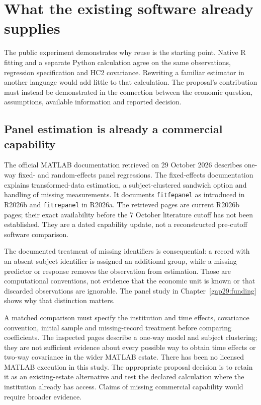\chapter{What the existing software already supplies}
\label{gap29:software-followup}
The public experiment demonstrates why reuse is the starting point. Native
R fitting and a separate Python calculation agree on the same observations,
regression specification and HC2 covariance. Rewriting a familiar estimator
in another language would add little to that calculation. The proposal's
contribution must instead be demonstrated in the connection between the
economic question, assumptions, available information and reported decision.

\section{Panel estimation is already a commercial capability}
The official MATLAB documentation retrieved on 29 October 2026 describes
one-way fixed- and random-effects panel regressions. The fixed-effects
documentation explains transformed-data estimation, a subject-clustered
sandwich option and handling of missing measurements. It documents
\texttt{fitfepanel} as introduced in R2026b and
\texttt{fitrepanel} in R2026a. The retrieved pages are current R2026b pages;
their exact availability before the 7 October literature cutoff has not been
established. They are a dated capability update, not a reconstructed
pre-cutoff software comparison. \citep{gap29matlab}

The documented treatment of missing identifiers is consequential: a record
with an absent subject identifier is assigned an additional group, while a
missing predictor or response removes the observation from estimation.
Those are computational conventions, not evidence that the economic unit
is known or that discarded observations are ignorable. The panel study in
Chapter~\ref{gap29:funding} shows why that distinction matters.

A matched comparison must specify the institution and time effects,
covariance convention, initial sample and missing-record treatment before
comparing coefficients. The inspected pages describe a one-way model and
subject clustering; they are not sufficient evidence about every possible
way to obtain time effects or two-way covariance in the wider MATLAB estate.
There has been no licensed MATLAB execution in this study. The appropriate
proposal decision is to retain it as an existing-estate alternative and
test the declared calculation where the institution already has access.
Claims of missing commercial capability would require broader evidence.

